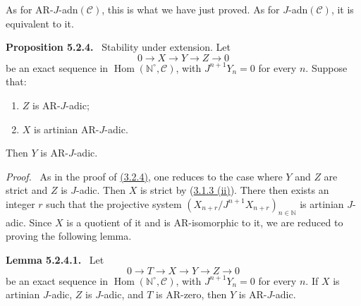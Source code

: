 \documentclass[11pt]{article}
\newenvironment{statement}[1]{\par\medskip\noindent\textbf{#1.}\ }{\par\medskip}
\newenvironment{prooftext}[1][Proof]{\par\noindent\emph{#1.}\ }{\par\medskip}
\DeclareMathOperator{\Hom}{Hom}
\providecommand{\Hom}{\operatorname{Hom}}
\providecommand{\Hom}{\operatorname{Hom}}
\begin{document}
As for AR-\(J\)-adn\((\mathcal C)\), this is what we have just proved. As for \(J\)-adn\((\mathcal C)\), it is equivalent to it.

\label{sga5:V:proposition:5.2.4}\begin{statement}{Proposition 5.2.4}
Stability under extension. Let
\[
0\longrightarrow X\longrightarrow Y\longrightarrow Z\longrightarrow0
\]
be an exact sequence in \(\Hom(\mathbb N^\circ,\mathcal C)\), with \(J^{n+1}Y_n=0\) for every \(n\). Suppose that:
\begin{enumerate}[label=\textup{(\roman*)}]
\item \(Z\) is AR-\(J\)-adic;
\item \(X\) is artinian AR-\(J\)-adic.
\end{enumerate}
Then \(Y\) is AR-\(J\)-adic.
\end{statement}

\begin{prooftext}
As in the proof of \hyperref[sga5:V:proposition:3.2.4]{(3.2.4)}, one reduces to the case where \(Y\) and \(Z\) are strict and \(Z\) is \(J\)-adic. Then \(X\) is strict by (\hyperref[sga5:V:proposition:3.1.3]{3.1.3 (ii)}). There then exists an integer \(r\) such that the projective system \((X_{n+r}/J^{n+1}X_{n+r})_{n\in\mathbb N}\) is artinian \(J\)-adic. Since \(X\) is a quotient of it and is AR-isomorphic to it, we are reduced to proving the following lemma.
\end{prooftext}

\label{sga5:V:lemma:5.2.4.1}\begin{statement}{Lemma 5.2.4.1}
Let
\[
0\longrightarrow T\longrightarrow X\longrightarrow Y\longrightarrow Z\longrightarrow0
\]
be an exact sequence in \(\Hom(\mathbb N^\circ,\mathcal C)\), with \(J^{n+1}Y_n=0\) for every \(n\). If \(X\) is artinian \(J\)-adic, \(Z\) is \(J\)-adic, and \(T\) is AR-zero, then \(Y\) is AR-\(J\)-adic.
\end{statement}
\end{document}
